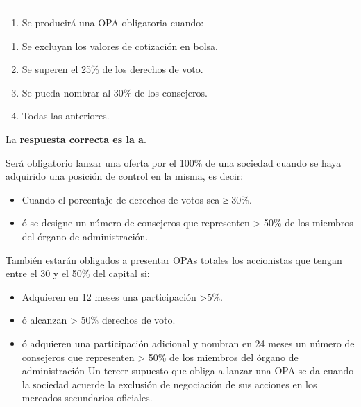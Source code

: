\documentclass[
  letterpaper,
  DIV=11,
  numbers=noendperiod]{scrreprt}
\providecommand{\tightlist}{%
  \setlength{\itemsep}{0pt}\setlength{\parskip}{0pt}}\usepackage{longtable,booktabs,array}
\begin{document}
\begin{center}\rule{0.5\linewidth}{0.5pt}\end{center}

\begin{enumerate}
\def\labelenumi{\arabic{enumi}.}
\setcounter{enumi}{59}
\tightlist
\item
  Se producirá una OPA obligatoria cuando:
\end{enumerate}

\begin{enumerate}
\def\labelenumi{\alph{enumi}.}
\item
  Se excluyan los valores de cotización en bolsa.
\item
  Se superen el 25\% de los derechos de voto.
\item
  Se pueda nombrar al 30\% de los consejeros.
\item
  Todas las anteriores.
\end{enumerate}

\begin{tcolorbox}[enhanced jigsaw, left=2mm, opacityback=0, colback=white, breakable, arc=.35mm, bottomrule=.15mm, rightrule=.15mm, toprule=.15mm, leftrule=.75mm, colframe=quarto-callout-tip-color-frame]
\begin{minipage}[t]{5.5mm}
\textcolor{quarto-callout-tip-color}{\faLightbulb}
\end{minipage}%
\begin{minipage}[t]{\textwidth - 5.5mm}

La \textbf{respuesta correcta es la a}.

Será obligatorio lanzar una oferta por el 100\% de una sociedad cuando
se haya adquirido una posición de control en la misma, es decir:

\begin{itemize}
\item
  Cuando el porcentaje de derechos de votos sea ≥ 30\%.
\item
  ó se designe un número de consejeros que representen \textgreater{}
  50\% de los miembros del órgano de administración.
\end{itemize}

También estarán obligados a presentar OPAs totales los accionistas que
tengan entre el 30 y el 50\% del capital si:

\begin{itemize}
\item
  Adquieren en 12 meses una participación \textgreater5\%.
\item
  ó alcanzan \textgreater{} 50\% derechos de voto.
\item
  ó adquieren una participación adicional y nombran en 24 meses un
  número de consejeros que representen \textgreater{} 50\% de los
  miembros del órgano de administración Un tercer supuesto que obliga a
  lanzar una OPA se da cuando la sociedad acuerde la exclusión de
  negociación de sus acciones en los mercados secundarios oficiales.
\end{itemize}

\end{minipage}%
\end{tcolorbox}
\end{document}
